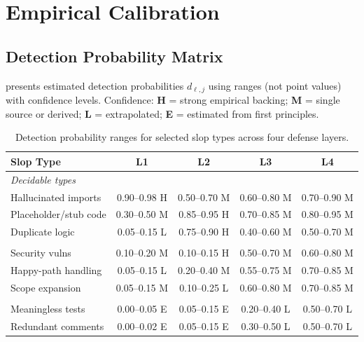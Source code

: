 \documentclass[11pt, a4paper, logo, copyright]{googledeepmind}
\begin{document}
\section{Empirical Calibration}
\label{sec:calibration}

\subsection{Detection Probability Matrix}

 presents estimated detection probabilities $d_{\ell,j}$ using ranges (not point values) with confidence levels. Confidence: \textbf{H} = strong empirical backing; \textbf{M} = single source or derived; \textbf{L} = extrapolated; \textbf{E} = estimated from first principles.

\begin{table}[htbp]
\centering
\caption{Detection probability ranges for selected slop types across four defense layers.}
\label{tab:detection}
\small
\begin{tabular}{@{}l c c c c@{}}
\toprule
\textbf{Slop Type} & \textbf{L1} & \textbf{L2} & \textbf{L3} & \textbf{L4} \\
\midrule
\multicolumn{5}{l}{\textit{Decidable types}} \\
\addlinespace
Hallucinated imports & 0.90--0.98 H & 0.50--0.70 M & 0.60--0.80 M & 0.70--0.90 M \\
Placeholder/stub code & 0.30--0.50 M & 0.85--0.95 H & 0.70--0.85 M & 0.80--0.95 M \\
Duplicate logic & 0.05--0.15 L & 0.75--0.90 H & 0.40--0.60 M & 0.50--0.70 M \\
\addlinespace
\multicolumn{5}{l}{\textit{Semi-decidable types}} \\
\addlinespace
Security vulns & 0.10--0.20 M & 0.10--0.15 H & 0.50--0.70 M & 0.60--0.80 M \\
Happy-path handling & 0.05--0.15 L & 0.20--0.40 M & 0.55--0.75 M & 0.70--0.85 M \\
Scope expansion & 0.05--0.15 M & 0.10--0.25 L & 0.60--0.80 M & 0.70--0.85 M \\
\addlinespace
\multicolumn{5}{l}{\textit{Undecidable types}} \\
\addlinespace
Meaningless tests & 0.00--0.05 E & 0.05--0.15 E & 0.20--0.40 L & 0.50--0.70 L \\
Redundant comments & 0.00--0.02 E & 0.05--0.15 E & 0.30--0.50 L & 0.50--0.70 L \\
\bottomrule
\end{tabular}
\end{table}
\end{document}
